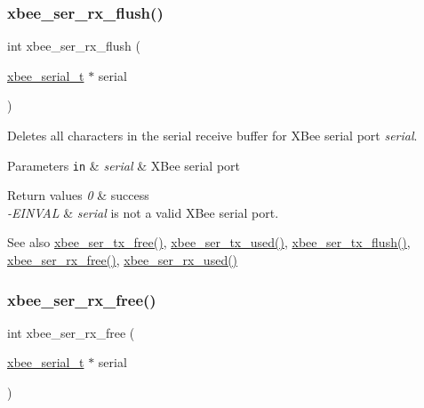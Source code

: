 \subsubsection{\texorpdfstring{xbee\+\_\+ser\+\_\+rx\+\_\+flush()}{xbee\_ser\_rx\_flush()}}
{\footnotesize\ttfamily int xbee\+\_\+ser\+\_\+rx\+\_\+flush (\begin{DoxyParamCaption}\item[{\hyperlink{structxbee__serial__t}{xbee\+\_\+serial\+\_\+t} $\ast$}]{serial }\end{DoxyParamCaption})}



Deletes all characters in the serial receive buffer for X\+Bee serial port {\itshape serial}. 


\begin{DoxyParams}[1]{Parameters}
\mbox{\tt in}  & {\em serial} & X\+Bee serial port\\
\hline
\end{DoxyParams}

\begin{DoxyRetVals}{Return values}
{\em 0} & success \\
\hline
{\em -\/\+E\+I\+N\+V\+AL} & {\itshape serial} is not a valid X\+Bee serial port.\\
\hline
\end{DoxyRetVals}
\begin{DoxySeeAlso}{See also}
\hyperlink{group__xbee__serial_ga3ad8f378b572d6fec982f1086bd3b94f}{xbee\+\_\+ser\+\_\+tx\+\_\+free()}, \hyperlink{group__xbee__serial_gaabf70934d186354cde4ac14ed27d1bd2}{xbee\+\_\+ser\+\_\+tx\+\_\+used()}, \hyperlink{group__xbee__serial_ga05308d37301d27715f1e1308b7189220}{xbee\+\_\+ser\+\_\+tx\+\_\+flush()}, \hyperlink{group__xbee__serial_ga16fb431a1e66861439518e562431821f}{xbee\+\_\+ser\+\_\+rx\+\_\+free()}, \hyperlink{group__xbee__serial_ga43b8322771cc16b4130fa5330ad2242b}{xbee\+\_\+ser\+\_\+rx\+\_\+used()} 
\end{DoxySeeAlso}
\mbox{\label{group__hal__hcs08_ga16fb431a1e66861439518e562431821f}} 
\subsubsection{\texorpdfstring{xbee\+\_\+ser\+\_\+rx\+\_\+free()}{xbee\_ser\_rx\_free()}}
{\footnotesize\ttfamily int xbee\+\_\+ser\+\_\+rx\+\_\+free (\begin{DoxyParamCaption}\item[{\hyperlink{structxbee__serial__t}{xbee\+\_\+serial\+\_\+t} $\ast$}]{serial }\end{DoxyParamCaption})}




